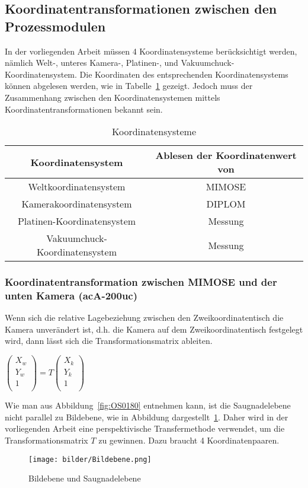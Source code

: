 \subsection{Koordinatentransformationen zwischen den Prozessmodulen} \label{sec:referenzieren}
In der vorliegenden Arbeit müssen 4 Koordinatensysteme berücksichtigt werden, nämlich Welt-, unteres Kamera-, Platinen-, und Vakuumchuck-Koordinatensystem. Die Koordinaten des entsprechenden Koordinatensystems können abgelesen werden, wie in Tabelle~\ref{tab:Koordinatensysteme} gezeigt. Jedoch muss der Zusammenhang zwischen den Koordinatensystemen mittels Koordinatentransformationen bekannt sein.
\begin{table}[H]
    \centering
    \begin{tabular}{c|c}
    \hline
         Koordinatensystem & Ablesen der Koordinatenwert von  \\
         \hline
         Weltkoordinatensystem & MIMOSE \\
         Kamerakoordinatensystem & DIPLOM \\
         Platinen-Koordinatensystem & Messung\\
         Vakuumchuck-Koordinatensystem & Messung\\
    \hline
    \end{tabular}
    \caption{Koordinatensysteme}
    \label{tab:Koordinatensysteme}
\end{table}

\subsubsection{Koordinatentransformation zwischen MIMOSE und der unten Kamera (acA-200uc)}

Wenn sich die relative Lagebeziehung zwischen den Zweikoordinatentisch die Kamera unverändert ist, d.h. die Kamera auf dem Zweikoordinatentisch festgelegt wird, dann lässt sich die Transformationsmatrix ableiten. 
\begin{center}
$
\begin{pmatrix}
X_w \\
Y_w \\
1 \\
\end{pmatrix} = 
T
\begin{pmatrix}
X_k \\
Y_k \\
1 \\
\end{pmatrix}
$
\end{center}
Wie man aus Abbildung~\ref{fig:OS0180} entnehmen kann, ist die Saugnadelebene nicht parallel zu Bildebene, wie in Abbildung dargestellt~\ref{fig:Bildebene}. Daher wird in der vorliegenden Arbeit eine perspektivische Transfermethode verwendet, um die Transformationsmatrix $T$ zu gewinnen\cite{5}. Dazu braucht 4 Koordinatenpaaren.
\begin{figure}[H]
    \centering
    \texttt{[image: bilder/Bildebene.png]}
    \caption{Bildebene und Saugnadelebene}
    \label{fig:Bildebene}
\end{figure}

